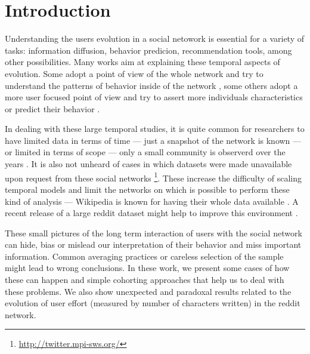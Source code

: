 \section{Introduction}


Understanding the users evolution in a social netowork is essential for a variety of tasks: information diffusion, behavior predicion, recommendation tools, among other possibilities. Many works aim at explaining these temporal aspects of evolution. Some adopt a point of view of the whole network and try to understand the patterns of behavior inside of the network \cite{Zhu2014, Kooti2010}, some others adopt a more user focused point of view and try to assert more individuals characteristics \cite{Correa2010, Priedhorsky2007, Panciera2009} or predict their behavior \cite{Danescu-niculescu-mizil2013}.

In dealing with these large temporal studies, it is quite common for researchers to have limited data in terms of time --- just a snapshot of the network is known \cite{} --- or limited in terms of scope --- only a small community is observerd over the years \cite{Lewis2008}. It is also not unheard of cases in which datasets were made unavailable upon request from these social networks \footnote{\url{http://twitter.mpi-sws.org/}}. These increase the difficulty of scaling temporal models and limit the networks on which is possible to perform these kind of analysis --- Wikipedia is known for having their whole data available \cite{Panciera2009, Priedhorsky2007}. A recent release of a large reddit dataset might help to improve this environment \cite{}.

These small pictures of the long term interaction of users with the social network can hide, bias or mislead our interpretation of their behavior and miss important information. Common averaging practices or careless selection of the sample might lead to wrong conclusions. In these work, we present some cases of how these can happen and simple cohorting approaches that help us to deal with these problems. We also show unexpected and paradoxal results related to the evolution of user effort (measured by number of characters written) in the reddit network.